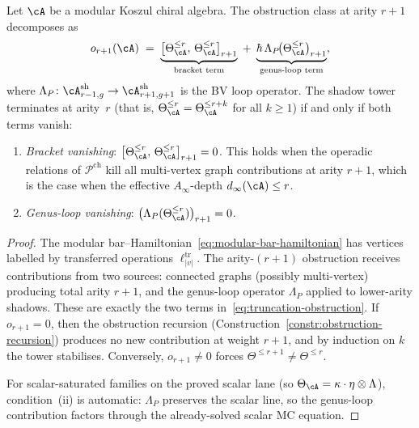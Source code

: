 \begin{lemma}
\label{lem:graph-sum-truncation}
\ClaimStatusProvedHere
{}
Let $\cA$ be a modular Koszul chiral algebra.
The obstruction class at arity $r{+}1$ decomposes as
\begin{equation}
\label{eq:truncation-obstruction}
o_{r+1}(\cA)
\;=\;
\underbrace{\bigl[\Theta_\cA^{\leq r},\,
\Theta_\cA^{\leq r}\bigr]_{r+1}}_{\text{bracket term}}
\;+\;
\underbrace{\hbar\,\Lambda_P\!\bigl(\Theta_\cA^{\leq r}
\bigr)_{r+1}}_{\text{genus-loop term}},
\end{equation}
where $\Lambda_P\colon \cA^{\mathrm{sh}}_{r-1,g} \to
\cA^{\mathrm{sh}}_{r+1,g+1}$ is the BV loop operator.
The shadow tower terminates at arity~$r$ (that is,
$\Theta_\cA^{\leq r} = \Theta_\cA^{\leq r+k}$ for all
$k \geq 1$) if and only if both terms vanish:
\begin{enumerate}[label=\textup{(\roman*)}]
\item \emph{Bracket vanishing}:
  $\bigl[\Theta_\cA^{\leq r},\,
  \Theta_\cA^{\leq r}\bigr]_{r+1} = 0$.
  This holds when the operadic relations of
  $\mathcal{P}^{\mathrm{ch}}$ kill all multi-vertex
  graph contributions at arity $r{+}1$, which is
  the case when the effective $A_\infty$-depth
  $d_\infty(\cA) \leq r$.
\item \emph{Genus-loop vanishing}:
  $\bigl(\Lambda_P(\Theta_\cA^{\leq r})\bigr)_{r+1} = 0$.
\end{enumerate}
\end{lemma}

\begin{proof}
The modular bar--Hamiltonian~\eqref{eq:modular-bar-hamiltonian}
has vertices labelled by transferred operations
$\ell_{|v|}^{\mathrm{tr}}$.
The arity-$(r{+}1)$ obstruction receives
contributions from two sources: connected graphs (possibly
multi-vertex) producing total arity $r{+}1$, and the
genus-loop operator $\Lambda_P$ applied to lower-arity
shadows.  These are exactly the two terms
in~\eqref{eq:truncation-obstruction}.  If $o_{r+1} = 0$,
then the obstruction recursion
(Construction~\ref{constr:obstruction-recursion})
produces no new contribution at weight $r{+}1$, and
by induction on $k$ the tower stabilises.  Conversely,
$o_{r+1} \neq 0$ forces $\Theta^{\leq r+1} \neq
\Theta^{\leq r}$.

For scalar-saturated families on the proved scalar lane
\textup{(}so $\Theta_\cA = \kappa \cdot \eta \otimes
\Lambda$\textup{)}, condition~(ii) is automatic:
$\Lambda_P$ preserves the scalar line, so the genus-loop
contribution factors through the already-solved scalar MC
equation.
\end{proof}

